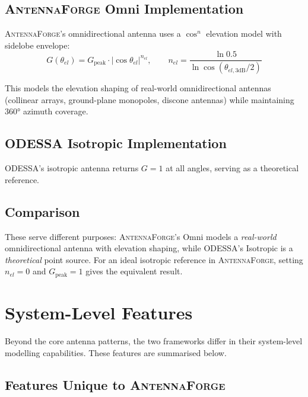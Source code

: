 \documentclass[11pt,a4paper]{article}
\newcommand{\AF}{\textsc{AntennaForge}}
\newcommand{\OD}{\textsc{ODESSA}}
\begin{document}
\subsection{\AF{} Omni Implementation}

\AF{}'s omnidirectional antenna uses a $\cos^n$ elevation model with sidelobe
envelope:
\begin{equation}
  G(\theta_{el}) = G_\text{peak} \cdot |\cos\theta_{el}|^{n_{el}},
  \qquad
  n_{el} = \frac{\ln 0.5}{\ln \cos(\theta_{el,3\text{dB}}/2)}
\end{equation}

This models the elevation shaping of real-world omnidirectional antennas
(collinear arrays, ground-plane monopoles, discone antennas) while maintaining
360° azimuth coverage.

\subsection{\OD{} Isotropic Implementation}

\OD{}'s isotropic antenna returns $G = 1$ at all angles, serving as a
theoretical reference.

\subsection{Comparison}

These serve different purposes: \AF{}'s Omni models a \emph{real-world}
omnidirectional antenna with elevation shaping, while \OD{}'s Isotropic is
a \emph{theoretical} point source.  For an ideal isotropic reference in \AF{},
setting $n_{el} = 0$ and $G_\text{peak} = 1$ gives the equivalent result.

\section{System-Level Features}
\label{sec:features}

Beyond the core antenna patterns, the two frameworks differ in their
system-level modelling capabilities.  These features are summarised below.

\subsection{Features Unique to \AF{}}
\end{document}

